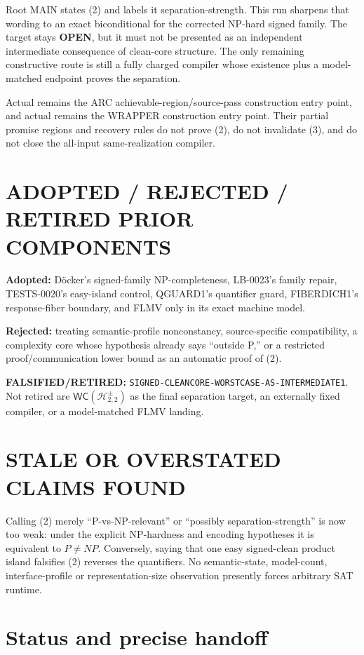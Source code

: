 \documentclass[11pt]{article}
\newcommand{\Hsigned}{\mathcal H^{\pm}_{2,2}}
\newcommand{\OPEN}{\textbf{OPEN}}
\begin{document}
Root MAIN states (2) and labels it separation-strength.  This run sharpens
that wording to an exact biconditional for the corrected NP-hard signed
family.  The target stays \OPEN, but it must not be presented as an
independent intermediate consequence of clean-core structure.  The only
remaining constructive route is still a fully charged compiler whose
existence plus a model-matched endpoint proves the separation.

Actual  remains the ARC achievable-region/source-pass
construction entry point, and actual  remains the WRAPPER
construction entry point.  Their partial promise regions and recovery rules
do not prove (2), do not invalidate (3), and do not close the all-input
same-realization compiler.

\section{ADOPTED / REJECTED / RETIRED PRIOR COMPONENTS}

\textbf{Adopted:} D\"ocker's signed-family NP-completeness, LB-0023's family
repair, TESTS-0020's easy-island control, QGUARD1's quantifier guard,
FIBERDICH1's response-fiber boundary, and FLMV only in its exact machine
model.

\textbf{Rejected:} treating semantic-profile nonconstancy, source-specific
compatibility, a complexity core whose hypothesis already says ``outside
P,'' or a restricted proof/communication lower bound as an automatic proof
of (2).

\textbf{FALSIFIED/RETIRED:}
\texttt{SIGNED-CLEANCORE-WORSTCASE-AS-INTERMEDIATE1}.  Not retired are
$\mathsf{WC}(\Hsigned)$ as the final separation target, an externally fixed
compiler, or a model-matched FLMV landing.

\section{STALE OR OVERSTATED CLAIMS FOUND}

Calling (2) merely ``P-vs-NP-relevant'' or ``possibly separation-strength''
is now too weak: under the explicit NP-hardness and encoding hypotheses it is
equivalent to $P\ne NP$.  Conversely, saying that one easy signed-clean
product island falsifies (2) reverses the quantifiers.  No semantic-state,
model-count, interface-profile or representation-size observation presently
forces arbitrary SAT runtime.

\section{Status and precise handoff}
\end{document}
